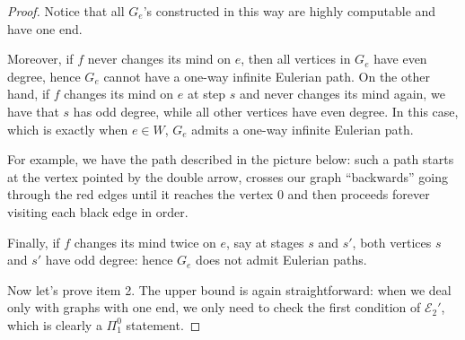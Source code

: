 \documentclass[10pt,A4]{amsart}
\theoremstyle{definition}
\theoremstyle{definition}
\newcommand{\eulertwo}{\mathscr{E} _{2}}
\newcommand{\vir}[1]{``#1''}
\begin{document}
\begin{proof}
    
    
    Notice that all $G_e$'s constructed in this way are highly computable and have one end.
    
    Moreover, if $f$ never changes its mind on $e$, then all vertices in $G_e$ have even degree, hence $G_e$ cannot have a one-way infinite Eulerian path. On the other hand, if $f$ changes its mind on $e$ at step $s$ and never changes its mind again, we have that $s$ has odd degree, while all other vertices have even degree. In this case, which is exactly when $e \in W$, $G_e$ admits a one-way infinite Eulerian path.
    
       For example, we have the path described in the picture below: such a path starts at the vertex pointed by the double arrow, crosses our graph \vir{backwards} going through the red edges until it reaches the vertex $0$ and then proceeds forever visiting each black edge in order.

    \begin{tcolorbox}
        \begin{center}

        \end{center}
    \end{tcolorbox} 
    
    Finally, if $f$ changes its mind twice on $e$, say at stages $s$ and $s'$, both vertices $s$ and $s'$ have odd degree: hence $G_e$ does not admit Eulerian paths.

Now let's prove item 2. The upper bound is again straightforward: when we deal only with graphs with one end, we only need to check the first condition of $\eulertwo '$, which is clearly a $\Pi_1^0$ statement.


\end{proof}
\end{document}
